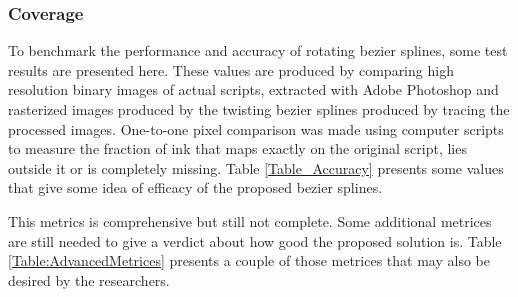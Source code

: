 \subsubsection{Coverage}
To benchmark the performance and accuracy  of rotating bezier splines, some test results are presented here. These values are produced by comparing high resolution binary images of actual scripts, extracted with Adobe Photoshop and rasterized images produced by the twisting bezier splines produced by tracing the processed images. One-to-one pixel comparison was made using computer scripts to measure the fraction of ink that maps exactly on the original script, lies outside it or is completely missing. Table \ref{Table_Accuracy} presents some values that give some idea of efficacy of the proposed bezier splines.
\begin{table}[ht]
\centering
{}
\caption{Benchmark of the mathematical accuracy of the twisting bezier spline curves}
\label{Table:Accuracy}
\end{table} 

This metrics is comprehensive but still not complete. Some additional metrices are still needed to give a verdict about how good the proposed solution is. Table \ref{Table:AdvancedMetrices} presents a couple of those metrices that may also be desired by the researchers.

